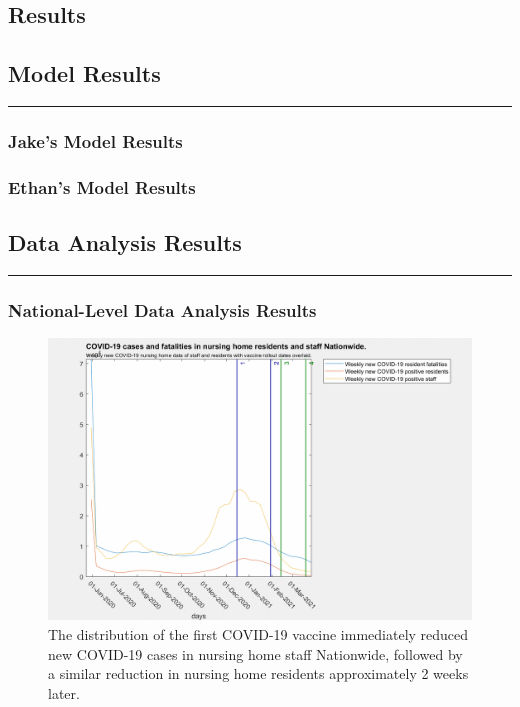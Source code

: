 \documentclass[twoside]{article}
\begin{document}
\begin{multicols}{2}
\section{Results}
\subsection{Model Results}
\rule{\linewidth}{0.25pt}

\subsubsection{Jake's Model Results}

\subsubsection{Ethan's Model Results}

\subsection{Data Analysis Results}
\rule{\linewidth}{0.25pt}

\subsubsection{National-Level Data Analysis Results}

\begin{figure}[H]
	\includegraphics[width=\linewidth]{images/nationwide_nursing_home_with_vaccine.png}
	\caption{The distribution of the first COVID-19 vaccine immediately reduced new COVID-19 cases in nursing home staff Nationwide, followed by a similar reduction in nursing home residents approximately 2 weeks later.  }
	\label{fig:images/nationwide_nursing_home_with_vaccineLabel}
\end{figure}


\end{multicols}
\end{document}

